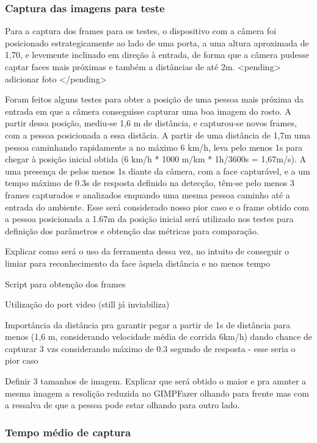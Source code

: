 \subsubsection{Captura das imagens para teste}

Para a captura dos frames para os testes, o dispositivo com a câmera foi posicionado estrategicamente ao lado de uma porta, a uma altura aproximada de 1,70, e levemente inclinado em direção à entrada, de forma que a câmera pudesse captar faces mais próximas e também a distâncias de até 2m. <pending> adicionar foto </pending>

Foram feitos alguns testes para obter a posição de uma pessoa mais próxima da entrada em que a câmera conseguisse capturar uma boa imagem do rosto. A partir dessa posição, mediu-se 1,6 m de distância, e capturou-se novos frames, com a pessoa posicionada a essa distâcia. A partir de uma distância de 1,7m uma pessoa caminhando rapidamente a no máximo 6 km/h, leva pelo menos 1s para chegar à posição inicial obtida (6 km/h * 1000 m/km * 1h/3600s = 1,67m/s). A uma presença de pelos menos 1s diante da câmera, com a face capturável, e a um tempo máximo de 0.3s de resposta definido na detecção, têm-se pelo menos 3 frames capturados e analizados enquando uma mesma pessoa caminho até a entrada do ambiente. Esse será considerado nosso pior caso e o frame obtido com a pessoa posicionada a 1.67m da posição inicial será utilizado nos testes para definição dos parâmetros e obtenção das métricas para comparação.

Explicar como será o uso da ferramenta dessa vez, no intuito de conseguir o limiar para reconhecimento da face àquela distância e no menos tempo

Script para obtenção dos frames

Utilização do port video (still já inviabiliza)

Importância da distância pra garantir pegar a partir de 1s de distância para menos (1,6 m, considerando velocidade média de corrida 6km/h) dando chance de capturar 3 vzs considerando máximo de 0.3 segundo de resposta - esse seria o pior caso

Definir 3 tamanhos de imagem. Explicar que será obtido o maior e pra amnter a mesma imagem a resolição reduzida no GIMPFazer olhando para frente mas com a ressalva de que a pessoa pode estar olhando para outro lado.

\subsubsection{Tempo médio de captura}

